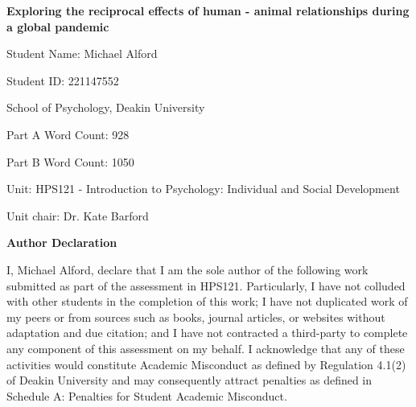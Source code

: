 \begin{titlepage}
  \begin{center}
    \textbf{Exploring the reciprocal effects of human - animal relationships during a global pandemic}
    
    \vspace{1.0cm}
    
    Student Name: Michael Alford
    
    \vspace{1.0cm}
    
    Student ID: 221147552
    
    \vspace{1.0cm}
    
    School of Psychology, Deakin University
    
    \vspace{1.0cm}
    
    Part A Word Count: 928
    
    \vspace{0.5cm}
    
    Part B Word Count: 1050
    
    \vspace{1.0cm}
    
    Unit: HPS121 - Introduction to Psychology: Individual and Social Development
    
    \vspace{1.0cm}
    
    Unit chair: Dr. Kate Barford

    \vfill

    \textbf{Author Declaration}

    I, Michael Alford, declare that I am the sole author of the following work submitted as part of the assessment  in  HPS121.  Particularly,  I  have  not  colluded  with  other  students  in  the  completion  of this work; I have not duplicated work     of my peers or from sources such as books, journal articles, or websites  without  adaptation  and  due  citation;  and  I  have  not  contracted  a  third-party  to  complete any  component  of  this  assessment  on  my  behalf.  I  acknowledge        that any  of  these  activities  would constitute  Academic  Misconduct  as  defined  by  Regulation  4.1(2)  of  Deakin  University  and  may consequently   attract   penalties   as   defined   in   Schedule   A:   Penalties   for   Student            Academic Misconduct.
    
  \end{center}
\end{titlepage}